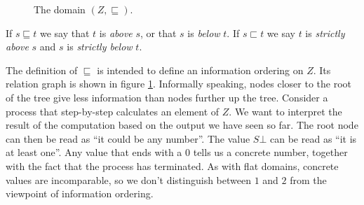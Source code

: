 \documentclass[a4paper]{article}
\begin{document}
\begin{figure}
\begin{center}
\end{center}
\caption{The domain $(Z, \sqsubseteq)$.}
\label{figDomainOfNuF}
\end{figure}

If $s \sqsubseteq t$ we say that $t$ is \emph{above} $s$, or that $s$ is
\emph{below} $t$.  If $s \sqsubset t$ we say $t$ is \emph{strictly above} $s$
and $s$ is \emph{strictly below} $t$.

The definition of $\sqsubseteq$ is intended to define an information ordering on
$Z$.  Its relation graph is shown in figure \ref{figDomainOfNuF}.
Informally speaking, nodes closer to the root of the tree give less information
than nodes further up the tree.  Consider a process that step-by-step calculates
an element of $Z$.  We want to interpret the result of the computation
based on the output we have seen so far.  The root node can then be read as ``it
could be any number''.  The value $S\bot$ can be read as ``it is at least one''.
Any value that ends with a $0$ tells us a concrete number, together with the
fact that the process has terminated.  As with flat domains, concrete values are
incomparable, so we don't distinguish between $1$ and $2$ from the viewpoint of
information ordering.
\end{document}
